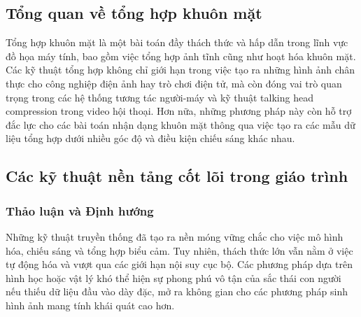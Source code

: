 \subsection{Tổng quan về tổng hợp khuôn mặt}
Tổng hợp khuôn mặt là một bài toán đầy thách thức và hấp dẫn trong lĩnh vực đồ họa máy tính, bao gồm việc tổng hợp ảnh tĩnh cũng như hoạt hóa khuôn mặt. Các kỹ thuật tổng hợp không chỉ giới hạn trong việc tạo ra những hình ảnh chân thực cho công nghiệp điện ảnh hay trò chơi điện tử, mà còn đóng vai trò quan trọng trong các hệ thống tương tác người-máy và kỹ thuật talking head compression trong video hội thoại. Hơn nữa, những phương pháp này còn hỗ trợ đắc lực cho các bài toán nhận dạng khuôn mặt thông qua việc tạo ra các mẫu dữ liệu tổng hợp dưới nhiều góc độ và điều kiện chiếu sáng khác nhau.

\subsection{Các kỹ thuật nền tảng cốt lõi trong giáo trình}







\subsubsection{Thảo luận và Định hướng}
Những kỹ thuật truyền thống đã tạo ra nền móng vững chắc cho việc mô hình hóa, chiếu sáng và tổng hợp biểu cảm. Tuy nhiên, thách thức lớn vẫn nằm ở việc tự động hóa và vượt qua các giới hạn nội suy cục bộ. Các phương pháp dựa trên hình học hoặc vật lý khó thể hiện sự phong phú vô tận của sắc thái con người nếu thiếu dữ liệu đầu vào dày đặc, mở ra không gian cho các phương pháp sinh hình ảnh mang tính khái quát cao hơn.
